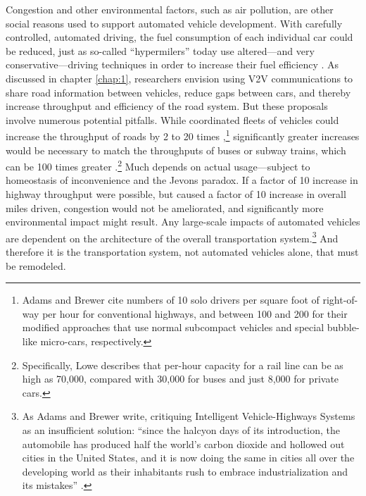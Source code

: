Congestion and other environmental factors, such as air pollution, are
other social reasons used to support automated vehicle development.
With carefully controlled, automated driving, the fuel consumption of each
individual car could be reduced, just as so-called ``hypermilers''
today use altered---and very conservative---driving techniques in
order to increase their fuel efficiency \cite{orourkeHypermile}. As discussed in
chapter \ref{chap:1}, researchers envision using V2V communications to
share road information between vehicles, reduce gaps between cars, and
thereby increase throughput and efficiency of the road system. But
these proposals involve numerous potential pitfalls. While coordinated
fleets of vehicles could increase the throughput of roads by 2 to 20
times \cite[p. 229]{adamsBrewerRoadways},\footnote{Adams and Brewer
  cite numbers of 10 solo drivers per square foot of right-of-way per
  hour for conventional highways, and between 100 and 200 for their
  modified approaches that use normal subcompact vehicles and special
  bubble-like micro-cars, respectively.} significantly greater increases would be necessary to match the
throughputs of buses or subway trains, which can be 100 times
greater \cite[p. 222]{loweCars}.\footnote{Specifically, Lowe describes that
  per-hour capacity for 
  a rail line can be as high as 70,000, compared with 30,000 for buses
and just 8,000 for private cars.} Much depends on actual usage---subject to
homeostasis of inconvenience and the Jevons paradox. If a factor of 10
increase in highway throughput were possible, but caused a factor of
10 increase in overall miles driven, congestion would not be
ameliorated, and significantly more environmental impact might result. Any
large-scale impacts of automated vehicles are dependent on the
architecture of the overall transportation system.\footnote{As Adams
  and Brewer write, critiquing Intelligent Vehicle-Highways Systems as
  an insufficient solution: ``since the halcyon days of its introduction, the
  automobile has produced half the world's carbon dioxide and hollowed
out cities in the United States, and it is now doing the same in
cities all over the developing world as their inhabitants rush to
embrace industrialization and its mistakes'' \cite[p.
  227]{adamsBrewerRoadways}.} And therefore it is
the transportation system, not automated vehicles alone, that must be remodeled.

